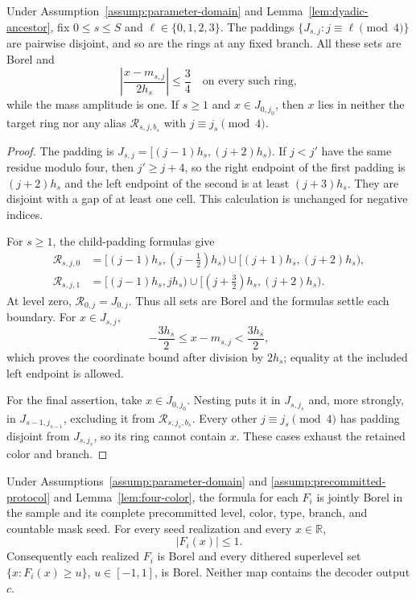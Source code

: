 \begin{lemma}
\label{lem:four-color}
Under Assumption~\ref{assump:parameter-domain} and
Lemma~\ref{lem:dyadic-ancestor}, fix $0\leq s\leq S$ and
$\ell\in\{0,1,2,3\}$.  The paddings
$\{J_{s,j}:j\equiv\ell\pmod4\}$ are pairwise disjoint, and so are the
rings at any fixed branch.  All these sets are Borel and
\[
 \left|\frac{x-m_{s,j}}{2h_s}\right|\leq\frac34
 \quad\text{on every such ring},
\]
while the mass amplitude is one.  If $s\geq1$ and
$x\in J_{0,j_0}$, then $x$ lies in neither the target ring nor any alias
$\mathcal R_{s,j,b_s}$ with $j\equiv j_s\pmod4$.
\end{lemma}

\begin{proof}
The padding is $J_{s,j}=[(j-1)h_s,(j+2)h_s)$.  If $j<j'$ have the same
residue modulo four, then $j'\geq j+4$, so the right endpoint of the first
padding is $(j+2)h_s$ and the left endpoint of the second is at least
$(j+3)h_s$.  They are disjoint with a gap of at least one cell.  This
calculation is unchanged for negative indices.

For $s\geq1$, the child-padding formulas give
\[
\begin{aligned}
 \mathcal R_{s,j,0}
 &=[(j-1)h_s,(j-\tfrac12)h_s)
   \cup[(j+1)h_s,(j+2)h_s),\\
 \mathcal R_{s,j,1}
 &=[(j-1)h_s,jh_s)
   \cup[(j+\tfrac32)h_s,(j+2)h_s).
\end{aligned}
\]
At level zero, $\mathcal R_{0,j}=J_{0,j}$.  Thus all sets are Borel and
the formulas settle each boundary.  For $x\in J_{s,j}$,
\[
 -\frac{3h_s}{2}\leq x-m_{s,j}<\frac{3h_s}{2},
\]
which proves the coordinate bound after division by $2h_s$; equality at the
included left endpoint is allowed.

For the final assertion, take $x\in J_{0,j_0}$.  Nesting puts it in
$J_{s,j_s}$ and, more strongly, in $J_{s-1,j_{s-1}}$, excluding it from
$\mathcal R_{s,j_s,b_s}$.  Every other $j\equiv j_s\pmod4$ has padding
disjoint from $J_{s,j_s}$, so its ring cannot contain $x$.  These cases
exhaust the retained color and branch.
\end{proof}

\begin{lemma}
\label{lem:query-measurability}
Under Assumptions~\ref{assump:parameter-domain} and
\ref{assump:precommitted-protocol} and Lemma~\ref{lem:four-color}, the
formula for each $F_i$ is jointly Borel in the sample and its complete
precommitted level, color, type, branch, and countable mask seed.  For every
seed realization and every $x\in\mathbb R$,
\[
 |F_i(x)|\leq1.
\]
Consequently each realized $F_i$ is Borel and every dithered superlevel set
$\{x:F_i(x)\geq u\}$, $u\in[-1,1]$, is Borel.  Neither map contains the
decoder output $c$.
\end{lemma}

